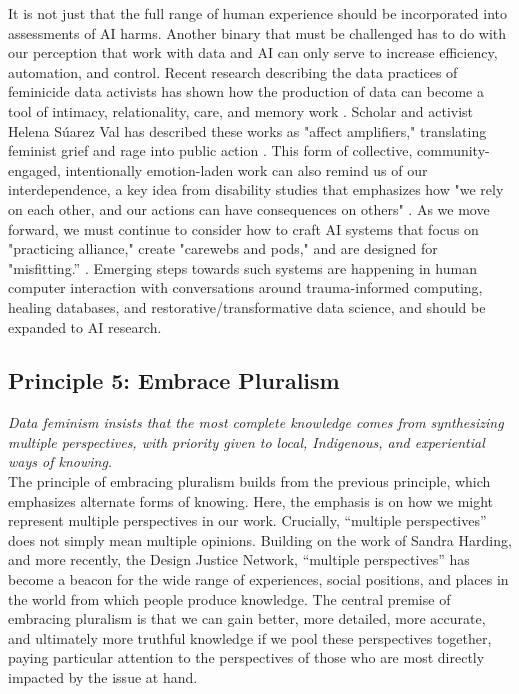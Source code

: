 It is not just that the full range of human experience should be incorporated into assessments of AI harms. Another binary that must be challenged has to do with our perception that work with data and AI can only serve to increase efficiency, automation, and control. 
Recent research describing the data practices of feminicide data activists has shown how the production of data can become a tool of intimacy, relationality, care, and memory work \cite{Gatwiri_Hasanova_2023}. Scholar and activist Helena Súarez Val has described these works as "affect amplifiers," translating feminist grief and rage into public action \cite{Val_2021}. 
This form of collective, community-engaged, intentionally emotion-laden work can also remind us of our 
interdependence, a key idea from disability studies that emphasizes how
"we rely on each other, and our actions can have consequences on others" \cite{Ansari}. 
As we move forward, we must continue to consider how to craft AI systems that focus on "practicing alliance," create "carewebs and pods," and are designed for "misfitting.” \cite{We_Are_Here, Piepzna-Samarasinha_2018, Garland-Thomson_2011}. Emerging steps towards such systems are happening in human computer interaction with conversations around trauma-informed computing, healing databases, and restorative/transformative data science, and should be expanded to AI research. 

\subsection{Principle 5: Embrace Pluralism}

\textit{Data feminism insists that the most complete knowledge comes from synthesizing multiple perspectives, with priority given to local, Indigenous, and experiential ways of knowing. 
}
\\[5pt]
The principle of embracing pluralism builds from the previous principle, which emphasizes alternate forms of knowing. Here, the emphasis is on how we might represent multiple perspectives in our work. Crucially, “multiple perspectives” does not simply mean multiple opinions. Building on the work of Sandra Harding, and more recently, the Design Justice Network, “multiple perspectives” has become a beacon for the wide range of experiences, social positions, and places in the world from which people produce knowledge. The central premise of embracing pluralism is that we can gain better, more detailed, more accurate, and ultimately more truthful knowledge if we pool these perspectives together, paying particular attention to the perspectives of those who are most directly impacted by the issue at hand.

